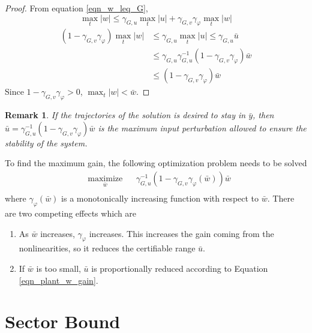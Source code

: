\documentclass[journal]{IEEEtran}
\newtheorem*{remark}{Remark}
\begin{document}
\begin{proof}
From equation \ref{eqn_w_leq_G},
$$\max_t|w|\leq\gamma_{G,u} \max_t|u|+\gamma_{G,v}\gamma_\varphi \max_t|w|$$
$$\begin{aligned} (1-\gamma_{G,v}\gamma_\varphi)\max_t|w| &\leq\gamma_{G,u} \max_t|u|\leq\gamma_{G,u}\bar{u} \\ 
&\leq\gamma_{G,u}\gamma_{G,u}^{-1}(1-\gamma_{G,v}\gamma_\varphi)\bar{w} \\
&\leq(1-\gamma_{G,v}\gamma_\varphi)\bar{w} \end{aligned}$$
Since $1-\gamma_{G,v}\gamma_\varphi>0$, $\max_t|w|<\bar{w}$.

\end{proof}

\begin{remark}
If the trajectories of the solution is desired to stay in $\bar{y}$, then $\bar{u}=\gamma_{G,u}^{-1}(1-\gamma_{G,v}\gamma_\varphi)\bar{w}$ is the maximum input perturbation allowed to ensure the stability of the system.
\end{remark}

To find the maximum gain, the following optimization problem needs to be solved 
\begin{equation}
\begin{aligned}
& \underset{\bar{w}}{\text{maximize}} & & \gamma_{G,u}^{-1}(1-\gamma_{G,v}\gamma_\varphi(\bar{w}))\bar{w} \\
\end{aligned}
\label{eqn_opt}
\end{equation}
where $\gamma_\varphi(\bar{w})$ is a monotonically increasing function with respect to $\bar{w}$.
There are two competing effects which are
\begin{enumerate}
\item As $\bar{w}$ increases, $\gamma_\varphi$ increases. This increases the gain coming from the nonlinearities, so it reduces the certifiable range $\bar{u}$.
\item If $\bar{w}$ is too small, $\bar{u}$ is proportionally reduced according to Equation \ref{eqn_plant_w_gain}.
\end{enumerate}

\section{Sector Bound}
\end{document}
